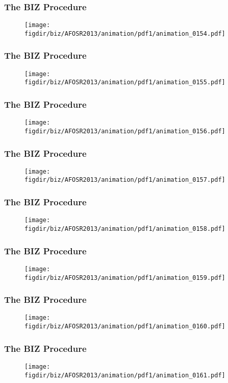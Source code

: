 \documentclass[13pt]{beamer}
\newcommand{\figdir}{../../fig}
\begin{document}
{\begin{frame}\frametitle{The BIZ Procedure}\begin{figure}\texttt{[image: \\figdir/biz/AFOSR2013/animation/pdf1/animation\_0154.pdf]}\end{figure}\end{frame}
\begin{frame}\frametitle{The BIZ Procedure}\begin{figure}\texttt{[image: \\figdir/biz/AFOSR2013/animation/pdf1/animation\_0155.pdf]}\end{figure}\end{frame}
\begin{frame}\frametitle{The BIZ Procedure}\begin{figure}\texttt{[image: \\figdir/biz/AFOSR2013/animation/pdf1/animation\_0156.pdf]}\end{figure}\end{frame}
\begin{frame}\frametitle{The BIZ Procedure}\begin{figure}\texttt{[image: \\figdir/biz/AFOSR2013/animation/pdf1/animation\_0157.pdf]}\end{figure}\end{frame}
\begin{frame}\frametitle{The BIZ Procedure}\begin{figure}\texttt{[image: \\figdir/biz/AFOSR2013/animation/pdf1/animation\_0158.pdf]}\end{figure}\end{frame}
\begin{frame}\frametitle{The BIZ Procedure}\begin{figure}\texttt{[image: \\figdir/biz/AFOSR2013/animation/pdf1/animation\_0159.pdf]}\end{figure}\end{frame}
\begin{frame}\frametitle{The BIZ Procedure}\begin{figure}\texttt{[image: \\figdir/biz/AFOSR2013/animation/pdf1/animation\_0160.pdf]}\end{figure}\end{frame}
\begin{frame}\frametitle{The BIZ Procedure}\begin{figure}\texttt{[image: \\figdir/biz/AFOSR2013/animation/pdf1/animation\_0161.pdf]}\end{figure}\end{frame}
}
\end{document}
